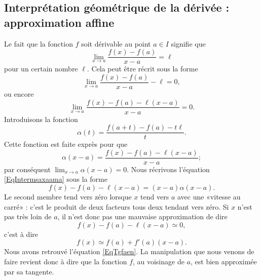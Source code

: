 \subsection[Interprétation géométrique : approximation affine]{Interprétation géométrique de la dérivée : approximation affine}

Le fait que la fonction $f$ soit dérivable au point $a\in I$ signifie que
\begin{equation}
	\lim_{x\to a} \frac{ f(x)-f(a) }{ x-a }=\ell
\end{equation}
pour un certain nombre $\ell$. Cela peut être récrit sous la forme
\begin{equation}
	\lim_{x\to a} \frac{ f(x)-f(a) }{ x-a }-\ell=0,
\end{equation}
ou encore
\begin{equation}
	\lim_{x\to a} \frac{ f(x)-f(a)-\ell(x-a) }{ x-a }=0.
\end{equation}
Introduisons la fonction
\begin{equation}
	\alpha(t)=\frac{ f(a+t)-f(a)-t\ell }{ t }.
\end{equation}
Cette fonction est faite exprès pour que
\begin{equation}		\label{EqIntermsaxaama}
	\alpha(x-a)=\frac{ f(x)-f(a)-\ell(x-a) }{ x-a };
\end{equation}
par conséquent $\lim_{x\to a} \alpha(x-a)=0$. Nous récrivons l'équation \eqref{EqIntermsaxaama} sous la forme
\begin{equation}        \label{EqCodeDerviffxam}
	f(x)-f(a)-\ell(x-a)=(x-a)\alpha(x-a).
\end{equation}
Le second membre tend vers zéro lorsque $x$ tend vers $a$ avec une «vitesse au carré» : c'est le produit de deux facteurs tous deux tendant vers zéro. Si $x$ n'est pas très loin de $a$, il n'est donc pas une mauvaise approximation de dire
\begin{equation}
	f(x)-f(a)-\ell(x-a)\simeq 0,
\end{equation}
c'est à dire
\begin{equation}		\label{Eqfxsimesfa}
	f(x)\simeq f(a)+f'(a)(x-a).
\end{equation}
Nous avons retrouvé l'équation \eqref{EqTgfaen}. La manipulation que nous venons de faire revient donc à dire que la fonction $f$, au voisinage de $a$, est bien approximée par sa tangente.

